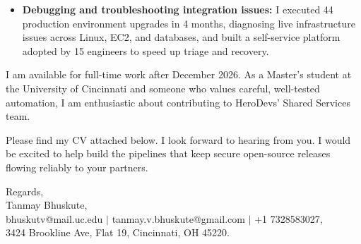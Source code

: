 \documentclass[11pt]{letter}
\begin{document}
\begin{letter}{}
\begin{itemize}[leftmargin=*, itemsep=0.45em]
    \item \textbf{Debugging and troubleshooting integration issues:} I executed 44 production environment upgrades in 4 months, diagnosing live infrastructure issues across Linux, EC2, and databases, and built a self-service platform adopted by 15 engineers to speed up triage and recovery.
\end{itemize}

I am available for full-time work after December 2026. As a Master's student at the University of Cincinnati and someone who values careful, well-tested automation, I am enthusiastic about contributing to HeroDevs' Shared Services team.

Please find my CV attached below. I look forward to hearing from you. I would be excited to help build the pipelines that keep secure open-source releases flowing reliably to your partners.

{\setlength{\parskip}{0pt}
Regards,\\
Tanmay Bhuskute,\\
bhuskutv@mail.uc.edu $\mid$ tanmay.v.bhuskute@gmail.com $\mid$ +1 7328583027,\\
3424 Brookline Ave, Flat 19, Cincinnati, OH 45220.
}

\end{letter}
\end{document}
